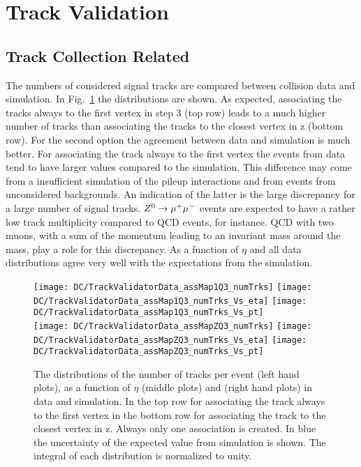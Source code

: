 \section{Track Validation \label{sec:DCTV}}

\subsection{Track Collection Related  \label{sec:DCTVTC}}

The numbers of considered signal tracks are compared between collision data and simulation. In Fig.~\ref{plot:DCTVTDQual} the distributions are shown. As expected, associating the tracks always to the first vertex in step 3 (top row) leads to a much higher number of tracks than associating the tracks to the closest vertex in z (bottom row). For the second option the agreement between data and simulation is much better. For associating the track always to the first vertex the events from data tend to have larger values compared to the simulation. This difference may come from a insufficient simulation of the pileup interactions and from events from unconsidered backgrounds. An indication of the latter is the large discrepancy for a large number of signal tracks. ${Z^{0}}\rightarrow\mu^+\mu^-$ events are expected to have a rather low track multiplicity compared to QCD events, for instance. QCD with two muons, with a sum of the momentum leading to an invariant mass around the \Zz{} mass, play a role for this discrepancy.  As a function of $\eta$ and \pt{} all data distributions agree very well with the expectations from the simulation.

\begin{figure}[Ht]
  \centering
  \texttt{[image: DC/TrackValidatorData\_assMap1Q3\_numTrks]}
  \texttt{[image: DC/TrackValidatorData\_assMap1Q3\_numTrks\_Vs\_eta]}
  \texttt{[image: DC/TrackValidatorData\_assMap1Q3\_numTrks\_Vs\_pt]}
  \\
  \texttt{[image: DC/TrackValidatorData\_assMapZQ3\_numTrks]}
  \texttt{[image: DC/TrackValidatorData\_assMapZQ3\_numTrks\_Vs\_eta]}
  \texttt{[image: DC/TrackValidatorData\_assMapZQ3\_numTrks\_Vs\_pt]}
  \caption[Track number and distribution in data and simulation of two options of the association map]{The distributions of the number of tracks per event (left hand plots), as a function of $\eta$ (middle plots) and \pt (right hand plots) in data and simulation. In the top row for associating the track always to the first vertex in the bottom row for associating the track to the closest vertex in z. Always only one association is created. In blue the uncertainty of the expected value from simulation is shown. The integral of each distribution is normalized to unity. \label{plot:DCTVTDQual}}
\end{figure}

